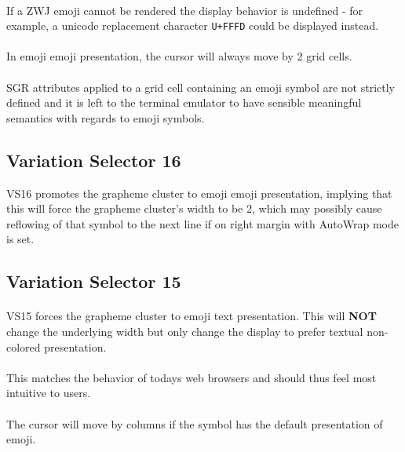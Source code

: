 \documentclass{article}
\newcommand{\code}[1]{\colorbox{light-gray}{\texttt{#1}}}
\begin{document}
\paragraph*{}
If a ZWJ emoji cannot be rendered the display behavior is undefined -
for example, a unicode replacement character \code{U+FFFD} could be
displayed instead.

\paragraph*{}
In emoji emoji presentation, the cursor will always move by 2 grid cells.

\paragraph*{}
SGR attributes applied to a grid cell containing an emoji symbol are
not strictly defined and it is left to the terminal emulator to have
sensible meaningful semantics with regards to emoji symbols.

\subsection{Variation Selector 16}

VS16 promotes the grapheme cluster to emoji emoji presentation,
implying that this will force the grapheme cluster's width to be 2,
which may possibly cause reflowing of that symbol to the next line
if on right margin with AutoWrap mode is set.

\subsection{Variation Selector 15}

\paragraph*{}
VS15 forces the grapheme cluster to emoji text presentation.
This will \textbf{NOT} change the underlying width
but only change the display to prefer textual non-colored presentation.

\paragraph*{}
This matches the behavior of todays web browsers and should thus
feel most intuitive to users.

\paragraph*{}
The cursor will move by columns if the symbol has the default presentation of emoji.
\end{document}
